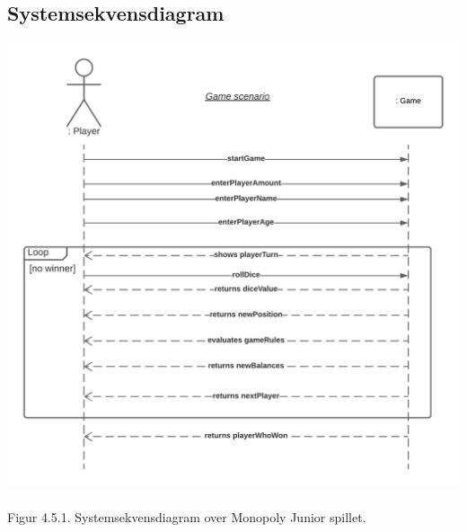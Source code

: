 \begin{flushleft}
\subsection{Systemsekvensdiagram}
\includegraphics[width=1\textwidth]{Report/figures/System sekvensdiagram.png}~\\[1cm]
Figur 4.5.1. Systemsekvensdiagram over Monopoly Junior spillet.

\end{flushleft}
